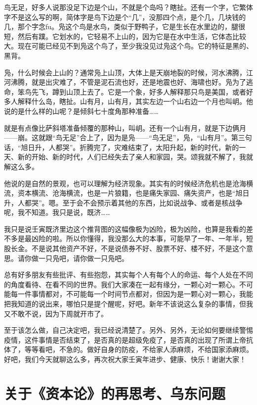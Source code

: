 \documentclass[UTF8, 12pt, a4paper]{ctexrep}
\begin{document}
鸟无足，好多人说那没足下边是个山，不就是个岛吗？瞎扯。还有一个字，它繁体字不是这么写的啊，简体字是鸟下边是个“几”，没那四个点，是个几，几块钱的几，那个字念fu。凫这个鸟是水鸟，类似于野鸭子，它是生长在水里边的，腿很短，然后有蹼。它划水的，它轻易不上山的，因为它是在水中生活，它体态比较大。现在可能已经见不到凫这个鸟了，至少我没见过凫这个鸟。它的特征是黑的、黑背。

凫，什么时候会上山的？通常凫上山顶，大体上是天崩地裂的时候，河水沸腾，江河沸腾，就是出灾难了，不管是泥石流也好，还是地震也好、海啸也好。凫为了逃命，笨鸟先飞，蹲到山顶上去了。它是一个象，好多人解释那只鸟是美国，或者好多人解释什么岛，瞎扯。山有月，山有月，其实左边一个山右边一个月也叫岄。他说的是什么样的山呢？是倾斜七十度角那种准备……

就是有点像比萨斜塔准备倾覆的那种山，叫岄。还有一个山有月，就是下边俩月——崩。这就跟“鸟无足”合上了，因为是凫——“鸟无足”，凫，“山有月”。第三句话，“旭日升，人都哭”。折腾完了，灾难结束了，太阳升起，新的时代，新的一天、新的开始、新的时代，人们已经失去了亲人和家园，哭。颂我就不解了，我就解这么多。

他说的是自然的景观，也可以理解为经济现象。其实有的时候经济危机也是沧海横流，资本横流、沧海横流，也是一片狼籍，也是痛失家园、痛失资产，也是“旭日升，人都哭”。嗯。至于会不会预示着其他的东西，比如说战争、或者是核战争呢，我不知道。我只是说，既济……

我只是说壬寅既济里边这个推背图的这幅像极为凶险，极为凶险，也算是我看的差不多是最凶险的啦。所以你懂得，我没那么大的本事，可能早了一年、一年半，短股长金。不是说其他资产不好，不是说债券不好、股票不好、楼不好，不是这个意思。请你做一只凫吧，请你做一只凫吧。

总有好多朋友有些批评、有些抱怨，其实每个人有每个人的命运、每个人处在不同的角度看待、在看不同的世界。我们大家凑在一起有缘分，一颗心对一颗心。不可能每一件事情都对，不可能每一个时间节点都对，但因为是一颗心对一颗心，我能把我知道的说出来，哪怕只是提个醒呢，好吧。新年不该说这么复杂的事情，但我又不敢不说，因为下周就开市了。

至于该怎么做，自己决定吧，我已经说清楚了。另外、另外，无论如何要继续警惕疫情，这件事情是否结束了，是否真的是超级免疫了，是否真的出现了所谓上帝抗体了，等等看吧，不急的。做好自身的防疫，不给家人添麻烦，不给国家添麻烦。好吧，我们今天就聊这么多，再次祝大家壬寅年进步、健康、快乐！谢谢大家！

\section{关于《资本论》的再思考、乌东问题}
\end{document}
